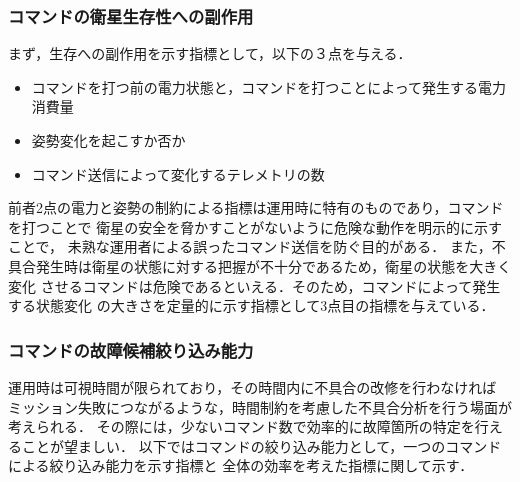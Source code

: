 \documentclass[11pt]{jsarticle}%
\begin{document}
\begin{multicols}{2}
  \subsubsection{コマンドの衛星生存性への副作用}
  まず，生存への副作用を示す指標として，以下の３点を与える．
\vspace{-1zh}
\begin{itemize}
    \item コマンドを打つ前の電力状態と，コマンドを打つことによって発生する電力消費量
    \item 姿勢変化を起こすか否か
    \item コマンド送信によって変化するテレメトリの数
  \end{itemize}
  前者2点の電力と姿勢の制約による指標は運用時に特有のものであり，コマンドを打つことで
  衛星の安全を脅かすことがないように危険な動作を明示的に示すことで，
  未熟な運用者による誤ったコマンド送信を防ぐ目的がある．
  また，不具合発生時は衛星の状態に対する把握が不十分であるため，衛星の状態を大きく変化
  させるコマンドは危険であるといえる．そのため，コマンドによって発生する状態変化
  の大きさを定量的に示す指標として3点目の指標を与えている．
\vspace{-1zh}
\subsubsection{コマンドの故障候補絞り込み能力}
  運用時は可視時間が限られており，その時間内に不具合の改修を行わなければ
  ミッション失敗につながるような，時間制約を考慮した不具合分析を行う場面が考えられる．
  その際には，少ないコマンド数で効率的に故障箇所の特定を行えることが望ましい．
  以下ではコマンドの絞り込み能力として，一つのコマンドによる絞り込み能力を示す指標と
  全体の効率を考えた指標に関して示す．


\end{multicols}
\end{document}
